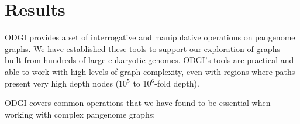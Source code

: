 \documentclass{bioinfo}
\begin{document}

\begin{comment}
key message of the paper is that we have collected a set of algorithms that enable easy use of pangenome graphs for investigating biology
-> build model solves problem of working with big graphs in memory
-> view (convert to GFA) & paths solve problem of exporting basic features of the graph (e.g. paths)
-> stats (understand basic size / structure) & bin & degree & depth solves problem of understanding the overall structure and size of the graph
-> sort (groom) & layout solves problem of finding latent structure in the pangenome
-> viz & draw provides a human-viewable readout of the graph
-> chop & unchop & squeeze & break & prune & explode lets us break apart or combine the graph nodes and topology
-> position & tips & untangle (jaccard based coordinate conversion) provides a way to map coordinates between any genomes in the graph (e.g. liftover!)
-> extract lets us pull out specific regions of the graph based on path ranges, nodes and positions
\end{comment}



\section{Results}

ODGI provides a set of interrogative and manipulative operations on pangenome graphs.
We have established these tools to support our exploration of graphs built from hundreds of large eukaryotic genomes.
ODGI's tools are practical and able to work with high levels of graph complexity, even with regions where paths present very high depth nodes (10$^5$ to 10$^6$-fold depth).

ODGI covers common operations that we have found to be essential when working with complex pangenome graphs:
\end{document}
